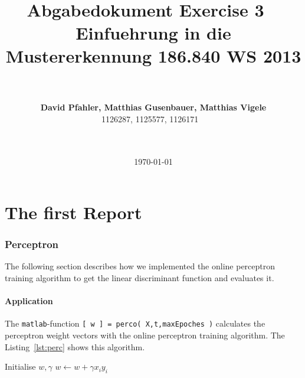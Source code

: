 \documentclass[subfigure,epsfig,fleqn,float,ausarbeitung]{scrartcl}
\begin{document}
\date{\today}

\title{~\\
  ~\\
  \fontsize{14}{14pt} \bf Abgabedokument Exercise 3
	 ~\\
  \fontsize{12}{12pt} \bf Einfuehrung in die Mustererkennung 186.840 WS 2013}

\author{~\\
  ~\\
  \fontsize{12}{12pt}
  {\bf David Pfahler, Matthias Gusenbauer, Matthias Vigele}\\
  1126287, 1125577, 1126171
  ~\\ ~\\ ~\\
  \normalsize
}

\maketitle
\normalfont
\thispagestyle{empty}


\part{The first Report}
\label{cha:firstReport}

\section{Perceptron}
\label{sec:perceptron}

The following section describes how we implemented the online perceptron training algorithm to get the linear discriminant function and evaluates it.

\subsection{Application}
\label{sec:1app}

The \texttt{matlab}-function \texttt{[ w ] = perco( X,t,maxEpoches )} calculates the perceptron weight vectors with the online perceptron training algorithm. The Listing~\ref{lst:perc} shows this algorithm.


\begin{algorithmic}[1]
\State Initialise $w,\gamma$
\Repeat
			\State $w\gets w + \gamma x_iy_i$
		\EndIf
	\EndFor
{}
\end{algorithmic}
\label{lst:perc}
\end{document}

